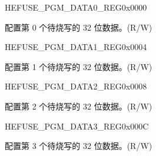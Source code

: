 \begin{register}{H}{EFUSE\_PGM\_DATA0\_REG}{0x0000}\label{regdesc:EFUSEPGMDATA0REG}
%
\regnewline%
\begin{regdesc}\begin{reglist}
\label{fielddesc:EFUSEPGMDATA0}\item [EFUSE\_PGM\_DATA\_0] 配置第 0 个待烧写的 32 位数据。(R/W)
\end{reglist}\end{regdesc}
\end{register}


\begin{register}{H}{EFUSE\_PGM\_DATA1\_REG}{0x0004}\label{regdesc:EFUSEPGMDATA1REG}
%
\regnewline%
\begin{regdesc}\begin{reglist}
\label{fielddesc:EFUSEPGMDATA1}\item [EFUSE\_PGM\_DATA\_1] 配置第 1 个待烧写的 32 位数据。(R/W)
\end{reglist}\end{regdesc}
\end{register}


\begin{register}{H}{EFUSE\_PGM\_DATA2\_REG}{0x0008}\label{regdesc:EFUSEPGMDATA2REG}
%
\regnewline%
\begin{regdesc}\begin{reglist}
\label{fielddesc:EFUSEPGMDATA2}\item [EFUSE\_PGM\_DATA\_2] 配置第 2 个待烧写的 32 位数据。(R/W)
\end{reglist}\end{regdesc}
\end{register}


\begin{register}{H}{EFUSE\_PGM\_DATA3\_REG}{0x000C}\label{regdesc:EFUSEPGMDATA3REG}
%
\regnewline%
\begin{regdesc}\begin{reglist}
\label{fielddesc:EFUSEPGMDATA3}\item [EFUSE\_PGM\_DATA\_3] 配置第 3 个待烧写的 32 位数据。(R/W)
\end{reglist}\end{regdesc}
\end{register}


